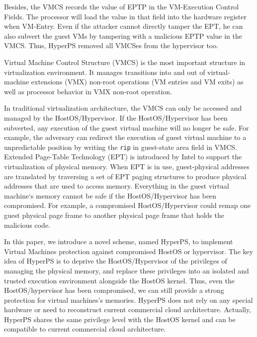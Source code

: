 Besides, the VMCS records the value of EPTP in the VM-Execution Control Fields. The processor will load the value in that field into the hardware register when VM-Entry. 
Even if the attacker cannot directly tamper the EPT, he can also subvert the guest VMs by tampering with a malicious EPTP value in the VMCS. Thus, HyperPS removed all VMCSes from the hypervisor too. 

Virtual Machine Control Structure (VMCS) is the most important structure in virtualization environment. It manages transitions into and out of virtual-machine extensions (VMX) non-root operations (VM entries and VM exits) as well as processor behavior in VMX non-root operation. 

In traditional virtualization architecture, the VMCS can only be accessed and managed by the HostOS/Hypervisor.
If the HostOS/Hypervisor has been subverted, any execution of the guest virtual machine will no longer be safe. For example, the adversary can redirect the execution of guest virtual machine to a unpredictable position by writing the \verb|rip| in guest-state area field in VMCS.
Extended Page-Table Technology (EPT) is introduced by Intel to support the virtualization of physical memory.
When EPT is in use, guest-physical addresses are translated by traversing a set of EPT paging structures to produce physical addresses that are used to access memory. Everything in the guest virtual machine`s memory cannot be safe if the HostOS/Hypervisor has been compromised. For example, a compromised HostOS/Hypervisor could remap one guest physical page frame to another physical page frame that holds the malicious code.
\fi

In this paper, we introduce a novel scheme, named HyperPS, to implement Virtual Machines protection against compromised HostOS or hypervisor.
The key idea of HyperPS is to deprive the HostOS/Hypervisor of the privileges of managing the physical memory, and replace these privileges into an isolated and trusted execution environment alongside the HostOS kernel.
Thus, even the HostOS/hypervisor has been compromised, we can still provide a strong protection for virtual machines's memories. 
HyperPS does not rely on any special hardware or need to reconstruct current commercial cloud architecture. Actually, HyperPS shares the same privilege level with the HostOS kernel and can be compatible to current commercial cloud architecture. 

